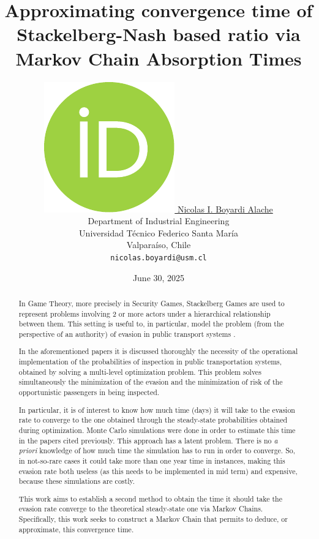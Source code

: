 \documentclass{article}
\title{Approximating convergence time of Stackelberg-Nash based ratio via Markov Chain Absorption Times}
\date{June 30, 2025}
\author{ \href{https://orcid.org/0000-0000-0000-0000}{\includegraphics[scale=0.06]{orcid.pdf}\hspace{1mm} Nicolas I. Boyardi Alache}\\
	Department of Industrial Engineering\\
	Universidad Técnico Federico Santa María\\
	Valparaíso, Chile\\
	\texttt{nicolas.boyardi@usm.cl} \\
}
\begin{document}
\maketitle

\begin{abstract}
	In Game Theory, more precisely in Security Games, Stackelberg Games are used to represent problems involving 2 or more actors under a hierarchical relationship between them. This setting is useful to, in particular, model the problem (from the perspective of an authority) of evasion in public transport systems \citep{FareInspection} \citep{BROTCORNE20211}.\par
In the aforementioned papers it is discussed thoroughly the necessity of the operational implementation of the probabilities of inspection in public transportation systems, obtained by solving a multi-level optimization problem. This problem solves simultaneously the minimization of the evasion and the minimization of risk of the opportunistic passengers in being inspected.\par
In particular, it is of interest to know how much time (days) it will take to the evasion rate to converge to the one obtained through the steady-state probabilities obtained during optimization. Monte Carlo simulations were done in order to estimate this time in the papers cited previously. This approach has a latent problem. There is no \textit{a priori} knowledge of how much time the simulation has to run in order to converge. So, in not-so-rare cases it could take more than one year time in instances, making this evasion rate both useless (as this needs to be implemented in mid term) and expensive, because these simulations are costly.\par
This work aims to establish a second method to obtain the time it should take the evasion rate converge to the theoretical steady-state one via Markov Chains. Specifically, this work seeks to construct a Markov Chain that permits to deduce, or approximate, this convergence time.\par
%
\end{abstract}


\end{document}
